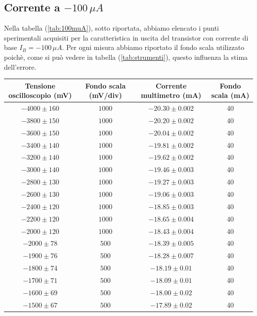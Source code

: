 \documentclass[]{article}
\begin{document}
\subsection{Corrente a $ -100\,\mu A $}
Nella tabella (\ref{tab:100muA}), sotto riportata, abbiamo elencato i punti sperimentali acquisiti per la caratteristica in uscita del transistor con corrente di base $ I_{B}= -100\,\mu A $. Per ogni misura abbiamo riportato il fondo scala utilizzato poichè, come si può vedere in tabella (\ref{tab:strumenti}), questo influenza la stima dell'errore.
	\begin{table}[H]
		\centering
	\begin{tabular}{|c|c|c|c|}
		\hline
		Tensione oscilloscopio (mV)& Fondo scala (mV/div) & Corrente multimetro (mA) &Fondo scala (mA)\\
		\hline
		$ -4000\pm 160 $ &$ 1000 $ & $ -20.30\pm 0.002 $ &40\\
		\hline
		$-3800\pm150 $ &$ 1000 $ & $ -20.20\pm0.002 $ &40 \\
		\hline
		$ -3600\pm 150 $ &$ 1000 $ & $ -20.04\pm 0.002 $ &40 \\
		\hline
		$ -3400\pm 140 $ &$ 1000 $ & $ -19.81\pm 0.002 $ &40 \\
		\hline
		$ -3200\pm 140 $ &$ 1000 $ & $-19.62\pm 0.002$ &40 \\
		\hline
		$ -3000\pm 140 $ &$ 1000 $ & $ -19.46\pm 0.003 $ &40 \\
		\hline
		$ -2800\pm 130 $ &$ 1000 $ & $ -19.27\pm 0.003 $ &40 \\
		\hline
		$ -2600\pm 130 $ &$ 1000 $ & $ -19.06\pm 0.003 $ &40 \\
		\hline
		$ -2400\pm 120 $ &$ 1000 $ & $ -18.85\pm 0.003 $ &40 \\
		\hline
		$ -2200\pm 120 $ &$ 1000 $ & $ -18.65\pm 0.004 $ &40 \\
		\hline
		$ -2000\pm 120 $ &$ 1000 $ & $ -18.43\pm0.004 $  &40\\
		\hline
		$ -2000\pm 78 $ &$ 500 $ & $ -18.39\pm0.005 $  &40\\
		\hline
		$ -1900\pm 76 $ &$ 500 $ & $ -18.28\pm0.007 $  &40\\
		\hline
		$ -1800\pm 74 $ &$ 500 $ & $ -18.19\pm 0.01 $ &40 \\
		\hline
		$ -1700\pm 71 $ &$ 500 $ & $ -18.09\pm 0.01 $ &40 \\
		\hline
		$ -1600\pm 69 $ &$ 500 $ & $ -18.00\pm 0.02 $ &40 \\
		\hline
		$ -1500\pm 67 $ &$ 500 $ & $ -17.89\pm 0.02 $ &40 \\

\end{tabular}
\end{table}
\end{document}
